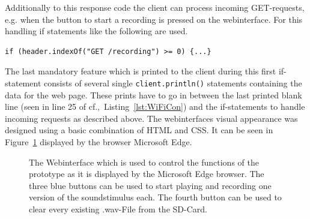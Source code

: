 Additionally to this response code the client can process incoming GET-requests, e.g. when the button to start a recording is pressed on the webinterface.
For this handling if statements like the following are used.
\begin{lstlisting}[style=inText] 
	if (header.indexOf("GET /recording") >= 0) {...}  
\end{lstlisting}
The last mandatory feature which is printed to the client during this first if-statement consists of several single \texttt{client.println()} statements containing the data for the web page.
These prints have to go in between the last printed blank line (seen in line 25 of cf.,~Listing~\ref{lst:WiFiCon}) and the if-statements to handle incoming requests as described above.
The webinterfaces visual appearance was designed using a basic combination of HTML and CSS.
It can be seen in Figure~\ref{fig:webinterface} displayed by the browser Microsoft Edge.

\begin{figure}
	\caption{The Webinterface which is used to control the functions of the prototype as it is displayed by the Microsoft Edge browser. The three blue buttons can be used to start playing and recording one version of the soundstimulus each. The fourth button can be used to clear every existing .wav-File from the SD-Card.}
	\label{fig:webinterface}
\end{figure}

